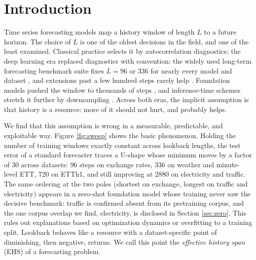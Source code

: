 \section{Introduction}

Time series forecasting models map a history window of length $L$ to a future horizon. The choice of $L$ is one of the oldest decisions in the field, and one of the least examined. Classical practice selects it by autocorrelation diagnostics; the deep learning era replaced diagnostics with convention: the widely used long-term forecasting benchmark suite fixes $L = 96$ or $336$ for nearly every model and dataset \citep{dlinear, patchtst, itransformer, timesnet}, and extensions past a few hundred steps rarely help \citep{dlinear}. Foundation models pushed the window to thousands of steps \citep{chronos, timesfm, toto2}, and inference-time schemes stretch it further by downsampling \citep{sprint}. Across both eras, the implicit assumption is that history is a resource: more of it should not hurt, and probably helps.

We find that this assumption is wrong in a measurable, predictable, and exploitable way. Figure \ref{fig:sweep} shows the basic phenomenon. Holding the number of training windows exactly constant across lookback lengths, the test error of a standard forecaster traces a U-shape whose minimum moves by a factor of 30 across datasets: 96 steps on exchange rates, 336 on weather and minute-level ETT, 720 on ETTh1, and still improving at 2880 on electricity and traffic. The same ordering at the two poles (shortest on exchange, longest on traffic and electricity) appears in a zero-shot foundation model whose training never saw the decisive benchmark: traffic is confirmed absent from its pretraining corpus, and the one corpus overlap we find, electricity, is disclosed in Section \ref{sec:zero}. This rules out explanations based on optimization dynamics or overfitting to a training split. Lookback behaves like a resource with a dataset-specific point of diminishing, then negative, returns. We call this point the \emph{effective history span} (EHS) of a forecasting problem.

